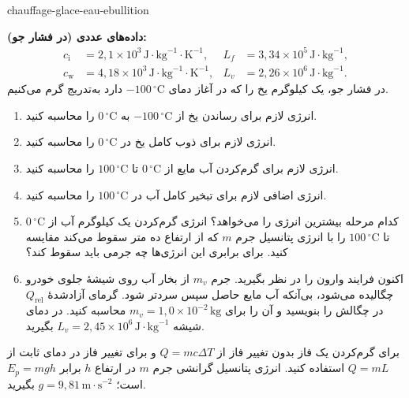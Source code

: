
\begin{exo}{chauffage-glace-eau-ebullition}

\textbf{داده‌های عددی (در فشار جو):}
\[
\begin{aligned}
c_{\mathrm{i}} &= 2{,}1\times10^3\,\text{J}\!\cdot\!\text{kg}^{-1}\!\cdot\!\text{K}^{-1},
& L_f &= 3{,}34\times10^5\,\text{J}\!\cdot\!\text{kg}^{-1},\\
c_{\mathrm{w}} &= 4{,}18\times10^3\,\text{J}\!\cdot\!\text{kg}^{-1}\!\cdot\!\text{K}^{-1},
& L_v &= 2{,}26\times10^6\,\text{J}\!\cdot\!\text{kg}^{-1}.
\end{aligned}
\]
در فشار جو، یک کیلوگرم یخ را که در آغاز دمای $-100\,{}^\circ\text{C}$ دارد به‌تدریج گرم می‌کنیم.

\begin{enumerate}
  \item انرژی لازم برای رساندن یخ از $-100\,{}^\circ\text{C}$ به $0\,{}^\circ\text{C}$ را محاسبه کنید.
  \item انرژی لازم برای ذوب کامل یخ در $0\,{}^\circ\text{C}$ را محاسبه کنید.
  \item انرژی لازم برای گرم‌کردن آب مایع از $0\,{}^\circ\text{C}$ تا $100\,{}^\circ\text{C}$ را محاسبه کنید.
  \item انرژی اضافی لازم برای تبخیر کامل آب در $100\,{}^\circ\text{C}$ را محاسبه کنید.
  \item کدام مرحله بیشترین انرژی را می‌خواهد؟ انرژی گرم‌کردن یک کیلوگرم آب از $0\,{}^\circ\text{C}$ تا $100\,{}^\circ\text{C}$ را با انرژی پتانسیل جرم $m$ که از ارتفاع ده متر سقوط می‌کند مقایسه کنید. برای برابری این انرژی‌ها چه جرمی باید سقوط کند؟
  \item اکنون فرایند وارون را در نظر بگیرید. جرم $m_v$ از بخار آب روی شیشهٔ جلوی خودرو چگالیده می‌شود، بی‌آنکه آب مایع حاصل سپس سردتر شود. گرمای آزادشدهٔ $Q_{\mathrm{rel}}$ در چگالش را بنویسید و آن را برای $m_v=1{,}0\times10^{-2}\,\text{kg}$ محاسبه کنید. در دمای شیشه $L_v=2{,}45\times10^6\,\text{J}\!\cdot\!\text{kg}^{-1}$ بگیرید.
\end{enumerate}

\begin{indication}
برای گرم‌کردن یک فاز بدون تغییر فاز از $Q=mc\Delta T$ و برای تغییر فاز در دمای ثابت از $Q=mL$ استفاده کنید. انرژی پتانسیل گرانشی جرم $m$ در ارتفاع $h$ برابر $E_p=mgh$ است؛ $g=9{,}81\,\text{m}\!\cdot\!\text{s}^{-2}$ بگیرید.
\end{indication}


\end{exo}
